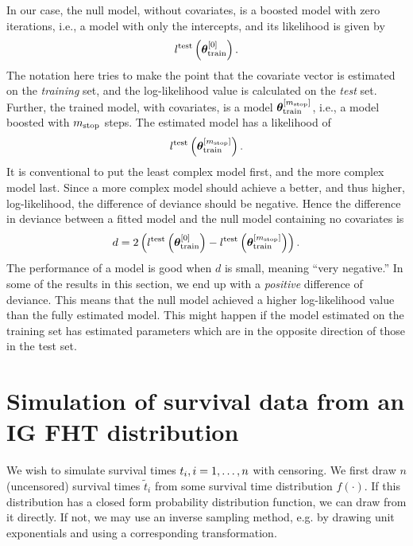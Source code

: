 In our case, the null model, without covariates, is a boosted model with zero iterations, i.e., a model with only the intercepts, and its likelihood is given by
\begin{equation}
    l^{\text{test}}\left(\boldsymbol{\theta}^{[0]}_{\text{train}}\right).
\end{equation}
The notation here tries to make the point that the covariate vector is estimated on the \textit{training} set, and the log-likelihood value is calculated on the \textit{test} set.
Further, the trained model, with covariates, is a model $\boldsymbol{\theta}^{[m_{\text{stop}}]}_{\text{train}}$, i.e., a model boosted with $m_{\text{stop}}$ steps.
The estimated model has a likelihood of
\begin{equation}
    l^{\text{test}}\left(\boldsymbol{\theta}^{[m_{\text{stop}}]}_{\text{train}}\right).
\end{equation}
It is conventional to put the least complex model first, and the more complex model last.
Since a more complex model should achieve a better, and thus higher, log-likelihood, the difference of deviance should be negative. 
Hence the difference in deviance between a fitted model and the null model containing no covariates is
\begin{equation*}
    d=2\left(l^{\text{test}}\left(\boldsymbol{\theta}^{[0]}_{\text{train}}\right)-l^{\text{test}}\left(\boldsymbol{\theta}^{[m_{\text{stop}}]}_{\text{train}}\right)\right).
\end{equation*}
The performance of a model is good when $d$ is small, meaning ``very negative.''
In some of the results in this section, we end up with a \textit{positive} difference of deviance.
This means that the null model achieved a higher log-likelihood value than the fully estimated model.
This might happen if the model estimated on the training set has estimated parameters which are in the opposite direction of those in the test set.

\section{Simulation of survival data from an IG FHT distribution}\label{sec:simulate-IG-data}
We wish to simulate survival times $t_{i},i=1,\ldots,n$ with censoring. We first draw $n$ (uncensored) survival times $\tilde{t}_i$ from some survival time distribution $f(\cdot)$. If this distribution has a closed form probability distribution function, we can draw from it directly. If not, we may use an inverse sampling method, e.g. by drawing unit exponentials and using a corresponding transformation.

